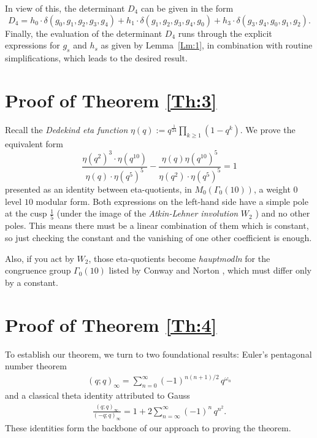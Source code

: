 \documentclass{article}
\begin{document}
\bigskip
\noindent
In view of this, the determinant $D_4$ can be given in the form
$$D_4
=h_0\cdot \delta(g_0,g_1,g_2,g_3,g_4)+h_1\cdot \delta(g_1,g_2,g_3,g_4,g_0)+h_3\cdot \delta(g_3,g_4,g_0,g_1,g_2).
$$
Finally, the evaluation of the determinant $D_{4}$ runs through the explicit expressions for $g_s$ and $h_s$ as given by Lemma~\ref{Lm:1}, in combination with routine simplifications,
which leads to the desired result.


\section{Proof of Theorem \ref{Th:3}} \label{S3}
Recall the \emph{Dedekind eta function} $\eta(q):=q^{\frac1{24}}\prod_{k\geq1}(1-q^k)$. We prove the equivalent form 
$$\frac{\eta(q^2)^3\cdot \eta(q^{10})}{\eta(q)\cdot \eta(q^5)^5}
 - \frac{\eta(q)\eta(q^{10})^5}{\eta(q^2)\cdot \eta(q^5)^5}=1$$
presented as an identity between eta-quotients, in $M_0(\Gamma_0(10))$, a weight $0$ level $10$ modular form. Both expressions on the left-hand side have a simple pole at the cusp 
$\frac15$ (under the image of the \emph{Atkin-Lehner involution} $W_2$ \cite{Atkin70}) and no other poles. This means there must be a linear combination of them which is constant, so just checking the constant and the vanishing of one other coefficient is enough.  

\smallskip
\noindent
Also, if you act by $W_2$, those eta-quotients become \emph{hauptmodln} for the congruence group $\Gamma_0(10)$ listed by Conway and Norton \cite{Conway79}, which must differ only by a constant. 

  \section{Proof of Theorem \ref{Th:4}} \label{S4}



To establish our theorem, we turn to two foundational results: Euler’s pentagonal number theorem 
 \begin{align*}
    (q;q)_\infty = \sum_{n=0}^\infty (-1)^{n(n+1)/2}\,q^{\omega_n} 
 \end{align*}
and a classical theta identity attributed to Gauss
  \begin{align}
    \frac{(q;q)_\infty}{(-q;q)_\infty} =1+2 \sum_{n=\infty}^\infty (-1)^n\,q^{n^2}. \label{eq:Gauss}
 \end{align}
These identities form the backbone of our approach to proving the theorem.
\end{document}
